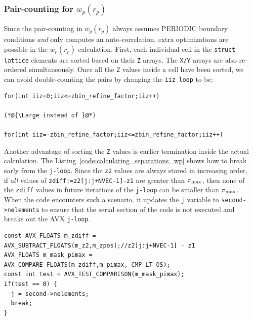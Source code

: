 \documentclass[12pt,titlepage]{article}
\newcommand{\wprp}{\ensuremath{{w_p(r_p)}}\xspace}
\newcommand{\pimax}{\ensuremath{{\pi_{\rm max}}}\xspace}
\begin{document}
\subsubsection{Pair-counting for \texorpdfstring{\wprp}{wp(rp)}}\label{section:pair_counting_wp}
Since the pair-counting in \wprp always assumes PERIODIC boundary conditions {\em and} only computes an auto-correlation, extra optimizations are possible in the
\wprp calculation. First, each individual cell in the \texttt{struct lattice} elements are sorted based on their \texttt{Z} arrays. The \texttt{X/Y} arrays are 
also re-ordered simultaneously. Once all the \texttt{Z} values inside a cell have been sorted, we can avoid double-counting the pairs by changing the \texttt{iiz loop}
to be:
\begin{lstlisting}[label={code:loop_optimization_wp},caption={Optimizing the loop over neighbouring cells \texttt{z} in \wprp.}]
for(int iiz=0;iiz<=zbin_refine_factor;iiz++)

(*@{\Large instead of }@*)

for(int iiz=-zbin_refine_factor;iiz<=zbin_refine_factor;iiz++)
\end{lstlisting}
Another advantage of sorting the \texttt{Z} values is earlier termination inside the actual calculation. The Listing~\ref{code:calculating_separations_wp} shows 
how to break early from the \texttt{j-loop}. Since the \texttt{z2} values are always stored in increasing order, if {\em all} values of \texttt{zdiff:=z2[j:j+NVEC-1]-z1}
are greater than \pimax, then none of the \texttt{zdiff} values in future iterations of the \texttt{j-loop} can be smaller than \pimax. When the code encounters 
such a scenario, it updates the \texttt{j} variable to \texttt{second->nelements} to ensure that the serial section of the code is not executed and breaks out the 
AVX \texttt{j-loop}. 
\begin{lstlisting}[label={code:calculating_separations_wp},caption={AVX intrinsics for calculating separations in \wprp and checking for early termination.}]
const AVX_FLOATS m_zdiff = AVX_SUBTRACT_FLOATS(m_z2,m_zpos);//z2[j:j+NVEC-1] - z1                                                                                                                                        
AVX_FLOATS m_mask_pimax = AVX_COMPARE_FLOATS(m_zdiff,m_pimax,_CMP_LT_OS);
const int test = AVX_TEST_COMPARISON(m_mask_pimax);
if(test == 0) {
  j = second->nelements;
  break;
}
\end{lstlisting}
\end{document}
